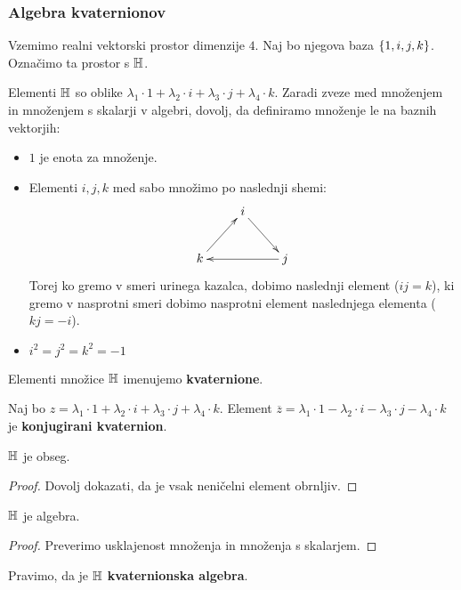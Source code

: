 \subsubsection*{Algebra kvaternionov}
\begin{primer}
    Vzemimo realni vektorski prostor dimenzije $4$. Naj bo njegova baza $\{1, i, j, k\}$. Označimo ta prostor s $\mathbb{H}$.
    
    Elementi $\mathbb{H}$ so oblike $\lambda_1 \cdot 1 + \lambda_2 \cdot i + \lambda_3 \cdot j + \lambda_4 \cdot k$. Zaradi zveze med množenjem in množenjem s skalarji v algebri, dovolj, da definiramo množenje le na baznih vektorjih:
    \begin{itemize}
        \item $1$ je enota za množenje.
        \item Elementi $i, j, k$ med sabo množimo po naslednji shemi:
        $$\xymatrix{
            & i \ar@{->}[rd] &  \\
           k \ar@{->}[ru] &  & j \ar@{->}[ll]
           }$$
        Torej ko gremo v smeri urinega kazalca, dobimo naslednji element ($ij = k$), ki gremo v nasprotni smeri dobimo nasprotni element naslednjega elementa ($kj = -i$).
        \item \(i^2=j^2=k^2 = -1\)
    \end{itemize}
    Elementi množice $\mathbb{H}$ imenujemo \textbf{kvaternione}.

    Naj bo $z = \lambda_1 \cdot 1 + \lambda_2 \cdot i + \lambda_3 \cdot j + \lambda_4 \cdot k$. Element $\overline{z} = \lambda_1 \cdot 1 - \lambda_2 \cdot i - \lambda_3 \cdot j - \lambda_4 \cdot k$ je \textbf{konjugirani kvaternion}.    
\end{primer}

\begin{trditev}
    $\mathbb{H}$ je obseg.
\end{trditev}

\begin{proof}
    Dovolj dokazati, da je vsak neničelni element obrnljiv.
\end{proof}

\begin{trditev}
    $\mathbb{H}$ je algebra.
\end{trditev}

\begin{proof}
    Preverimo usklajenost množenja in množenja s skalarjem.
\end{proof}

Pravimo, da je $\mathbb{H}$ \textbf{kvaternionska algebra}. 

